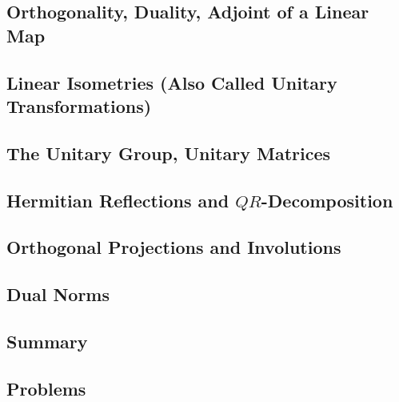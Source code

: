 \documentclass[a4paper]{article}
\begin{document}
\subsection{ Orthogonality, Duality, Adjoint of a Linear Map} %

\subsection{ Linear Isometries (Also Called Unitary Transformations)} %

\subsection{ The Unitary Group, Unitary Matrices} %

\subsection{ Hermitian Reflections and $QR$-Decomposition} %

\subsection{ Orthogonal Projections and Involutions} %

\subsection{ Dual Norms} %

\subsection{ Summary} %

\subsection{ Problems} %
\end{document}
